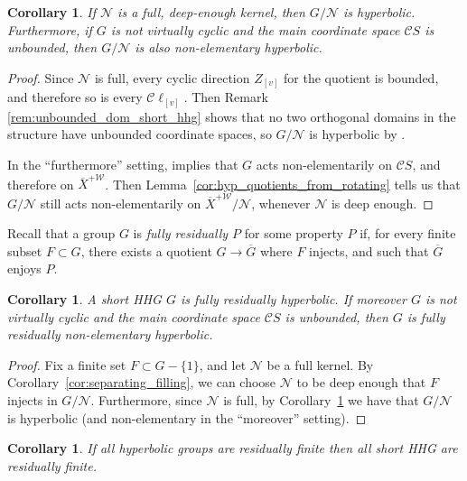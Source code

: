 \documentclass[svgnames]{amsart}
\theoremstyle{plain}
\newtheorem{cor}[thm]{Corollary}
\theoremstyle{definition}
\newcommand{\C}{\mathcal C}
\newcommand{\ov}[1]{\overline{#1}}
\newcommand{\N}{\mathcal{N}}
\newcommand{\W}{\mathcal{W}}
\begin{document}
\begin{cor}\label{cor:deep_full_is_hyp}
    If $\N$ is a full, deep-enough kernel, then $G/\N$ is hyperbolic. Furthermore, if $G$ is not virtually cyclic and the main coordinate space $\C S$ is unbounded, then $G/\N$ is also non-elementary hyperbolic.
\end{cor}

\begin{proof}
    Since $\N$ is full, every cyclic direction $Z_{[v]}$ for the quotient is bounded, and therefore so is every $\C\ell_{[v]}$. Then Remark \ref{rem:unbounded_dom_short_hhg} shows that no two orthogonal domains in the structure have unbounded coordinate spaces, so $G/\N$ is hyperbolic by \cite[Corollary 2.16]{quasiflats}. 
    
    In the “furthermore” setting, \cite[Corollary 14.4]{HHS_I} implies that $G$ acts non-elementarily on $\C S$, and therefore on $\ov X^{+\W}$. Then Lemma~\ref{cor:hyp_quotients_from_rotating} tells us that $G/\N$ still acts non-elementarily on $\ov X^{+\W}/\N$, whenever $\N$ is deep enough.
\end{proof}

Recall that a group $G$ is \emph{fully residually $P$} for some property $P$ if, for every finite subset $F\subset G$, there exists a quotient $G\to \ov G$ where $F$ injects, and such that $\ov G$ enjoys $P$.

\begin{cor}\label{cor:fullres_hyp}
    A short HHG $G$ is fully residually hyperbolic. If moreover $G$ is not virtually cyclic and the main coordinate space $\C S$ is unbounded, then $G$ is fully residually non-elementary hyperbolic.
\end{cor}

\begin{proof}
    Fix a finite set $F\subset G-\{1\}$, and let $\N$ be a full kernel. By Corollary~\ref{cor:separating_filling}, we can choose $\N$ to be deep enough that $F$ injects in $G/\N$. Furthermore, since $\N$ is full, by Corollary~\ref{cor:deep_full_is_hyp} we have that $G/\N$ is hyperbolic (and non-elementary in the “moreover” setting).
\end{proof}


\begin{cor}\label{cor:if_hyp_resfin}
    If all hyperbolic groups are residually finite then all short HHG are residually finite.
\end{cor}
\end{document}
